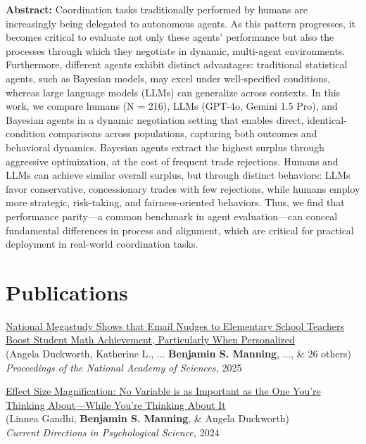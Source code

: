 \documentclass[margin,line,pifont,palatino,courier, 9pt]{res}
\begin{document}
\begin{resume}
\begin{singlespace}
\footnotesize
\textbf{Abstract: }Coordination tasks traditionally performed by humans are increasingly being delegated to autonomous agents. As this pattern progresses, it becomes critical to evaluate not only these agents' performance but also the processes through which they negotiate in dynamic, multi-agent environments. Furthermore, different agents exhibit distinct advantages: traditional statistical agents, such as Bayesian models, may excel under well-specified conditions, whereas large language models (LLMs) can generalize across contexts. In this work, we compare humans (N = 216), LLMs (GPT-4o, Gemini 1.5 Pro), and Bayesian agents in a dynamic negotiation setting that enables direct, identical-condition comparisons across populations, capturing both outcomes and behavioral dynamics. Bayesian agents extract the highest surplus through aggressive optimization, at the cost of frequent trade rejections. Humans and LLMs can achieve similar overall surplus, but through distinct behaviors: LLMs favor conservative, concessionary trades with few rejections, while humans employ more strategic, risk-taking, and fairness-oriented behaviors. Thus, we find that performance parity---a common benchmark in agent evaluation---can conceal fundamental differences in process and alignment, which are critical for practical deployment in real-world coordination tasks.
\end{singlespace}


\section{\sc Publications}
\href{https://www.pnas.org/doi/10.1073/pnas.2418616122}{National Megastudy Shows that Email Nudges to Elementary School Teachers Boost Student Math Achievement, Particularly When Personalized}\\
(Angela Duckworth\footnotemark[\value{footnote}], Katherine L., ... \textbf{Benjamin S. Manning}, ..., \& 26 others\footnotemark[\value{footnote}])\\
\textit{Proceedings of the National Academy of Sciences,} 2025

\href{https://journals.sagepub.com/doi/full/10.1177/09637214241268222}{Effect Size Magnification: No Variable is as Important as the One You're Thinking About---While You're Thinking About It}\\
(Linnea Gandhi\footnotemark[\value{footnote}], \textbf{Benjamin S. Manning}, \& Angela Duckworth)\\
\textit{Current Directions in Psychological Science,} 2024


\end{resume}
\end{document}
